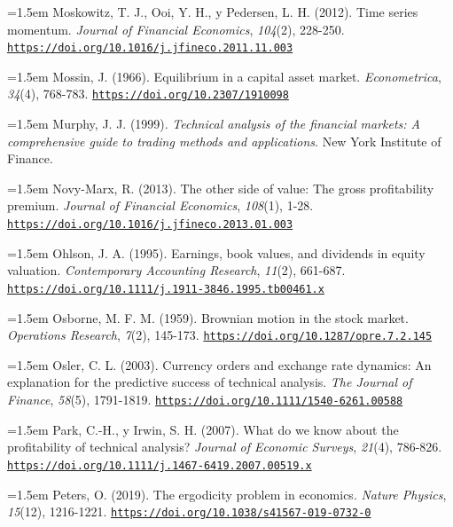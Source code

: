 \documentclass[10pt,a4paper]{article}
\begin{document}
\noindent\hangindent=1.5em Moskowitz, T. J., Ooi, Y. H., y Pedersen, L. H. (2012). Time series momentum. \textit{Journal of Financial Economics}, \textit{104}(2), 228-250. \href{https://doi.org/10.1016/j.jfineco.2011.11.003}{\nolinkurl{https://doi.org/10.1016/j.jfineco.2011.11.003}}

\noindent\hangindent=1.5em Mossin, J. (1966). Equilibrium in a capital asset market. \textit{Econometrica}, \textit{34}(4), 768-783. \href{https://doi.org/10.2307/1910098}{\nolinkurl{https://doi.org/10.2307/1910098}}

\noindent\hangindent=1.5em Murphy, J. J. (1999). \textit{Technical analysis of the financial markets: A comprehensive guide to trading methods and applications}. New York Institute of Finance.

\noindent\hangindent=1.5em Novy-Marx, R. (2013). The other side of value: The gross profitability premium. \textit{Journal of Financial Economics}, \textit{108}(1), 1-28. \href{https://doi.org/10.1016/j.jfineco.2013.01.003}{\nolinkurl{https://doi.org/10.1016/j.jfineco.2013.01.003}}

\noindent\hangindent=1.5em Ohlson, J. A. (1995). Earnings, book values, and dividends in equity valuation. \textit{Contemporary Accounting Research}, \textit{11}(2), 661-687. \href{https://doi.org/10.1111/j.1911-3846.1995.tb00461.x}{\nolinkurl{https://doi.org/10.1111/j.1911-3846.1995.tb00461.x}}

\noindent\hangindent=1.5em Osborne, M. F. M. (1959). Brownian motion in the stock market. \textit{Operations Research}, \textit{7}(2), 145-173. \href{https://doi.org/10.1287/opre.7.2.145}{\nolinkurl{https://doi.org/10.1287/opre.7.2.145}}

\noindent\hangindent=1.5em Osler, C. L. (2003). Currency orders and exchange rate dynamics: An explanation for the predictive success of technical analysis. \textit{The Journal of Finance}, \textit{58}(5), 1791-1819. \href{https://doi.org/10.1111/1540-6261.00588}{\nolinkurl{https://doi.org/10.1111/1540-6261.00588}}

\noindent\hangindent=1.5em Park, C.-H., y Irwin, S. H. (2007). What do we know about the profitability of technical analysis? \textit{Journal of Economic Surveys}, \textit{21}(4), 786-826. \href{https://doi.org/10.1111/j.1467-6419.2007.00519.x}{\nolinkurl{https://doi.org/10.1111/j.1467-6419.2007.00519.x}}

\noindent\hangindent=1.5em Peters, O. (2019). The ergodicity problem in economics. \textit{Nature Physics}, \textit{15}(12), 1216-1221. \href{https://doi.org/10.1038/s41567-019-0732-0}{\nolinkurl{https://doi.org/10.1038/s41567-019-0732-0}}
\end{document}
